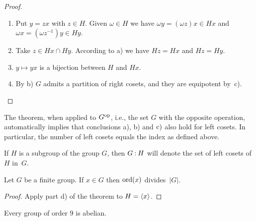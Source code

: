 \begin{proof}${}$

\begin{enumerate}[\rm a)]
    \item Put $y=zx$ with $z\in H$. Given $\omega\in H$ we have $\omega y = (\omega z)x\in Hx$ and $\omega x = (\omega z^{-1})y\in Hy$.

    \item Take $z\in Hx\cap Hy$. According to a) we have $Hz=Hx$ and $Hz=Hy$.

    \item $y\mapsto yx$ is a bijection between $H$ and $Hx$.

    \item By b) $G$ admits a partition of right cosets, and they are equipotent by~c).
\end{enumerate}
 \end{proof}

\begin{rem}\label{left-index}
    The theorem, when applied to $G^{\rm op}$, i.e., the set $G$ with the opposite operation, automatically implies that conclusions\/ {\rm a)}, {\rm b)} and ${\rm c)}$ also hold for left cosets. In particular, the number of left cosets equals the index as defined above. 
\end{rem}

\begin{ntn}
    If\/ $H$ is a subgroup of the group\/ $G$, then\/ $G\mathbin:H$ will denote the set of left cosets of\/ $H$ in\/~$G$.
\end{ntn}

\begin{cor}\label{ord(x)-divides-|G|}
    Let $G$ be a finite group. If $x \in G$ then ${\rm ord}(x)$ divides~$|G|$.
\end{cor}

\begin{proof} Apply part d) of the theorem to $H=\langle x\rangle$.  \end{proof}

\begin{xmpl}
    Every group of order\/ $9$ is abelian.
\end{xmpl}

